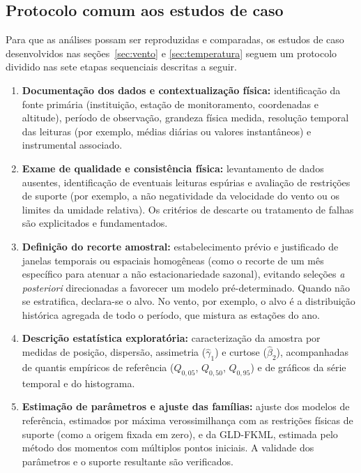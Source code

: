 \subsection{Protocolo comum aos estudos de caso}\label{subsec:protocolo}

Para que as análises possam ser reproduzidas e comparadas, os estudos de caso desenvolvidos nas seções~\ref{sec:vento} e \ref{sec:temperatura} seguem um protocolo dividido nas sete etapas sequenciais descritas a seguir.

\begin{enumerate}
    \item \textbf{Documentação dos dados e contextualização física:} identificação da fonte primária (instituição, estação de monitoramento, coordenadas e altitude), período de observação, grandeza física medida, resolução temporal das leituras (por exemplo, médias diárias ou valores instantâneos) e instrumental associado.

    \item \textbf{Exame de qualidade e consistência física:} levantamento de dados ausentes, identificação de eventuais leituras espúrias e avaliação de restrições de suporte (por exemplo, a não negatividade da velocidade do vento ou os limites da umidade relativa). Os critérios de descarte ou tratamento de falhas são explicitados e fundamentados.

    \item \textbf{Definição do recorte amostral:} estabelecimento prévio e justificado de janelas temporais ou espaciais homogêneas (como o recorte de um mês específico para atenuar a não estacionariedade sazonal), evitando seleções \textit{a posteriori} direcionadas a favorecer um modelo pré-determinado. Quando não se estratifica, declara-se o alvo. No vento, por exemplo, o alvo é a distribuição histórica agregada de todo o período, que mistura as estações do ano.

    \item \textbf{Descrição estatística exploratória:} caracterização da amostra por medidas de posição, dispersão, assimetria ($\widehat\gamma_1$) e curtose ($\widehat\beta_2$), acompanhadas de quantis empíricos de referência ($Q_{0,05}$, $Q_{0,50}$, $Q_{0,95}$) e de gráficos da série temporal e do histograma.

    \item \textbf{Estimação de parâmetros e ajuste das famílias:} ajuste dos modelos de referência, estimados por máxima verossimilhança com as restrições físicas de suporte (como a origem fixada em zero), e da GLD-FKML, estimada pelo método dos momentos com múltiplos pontos iniciais. A validade dos parâmetros e o suporte resultante são verificados.


\end{enumerate}
